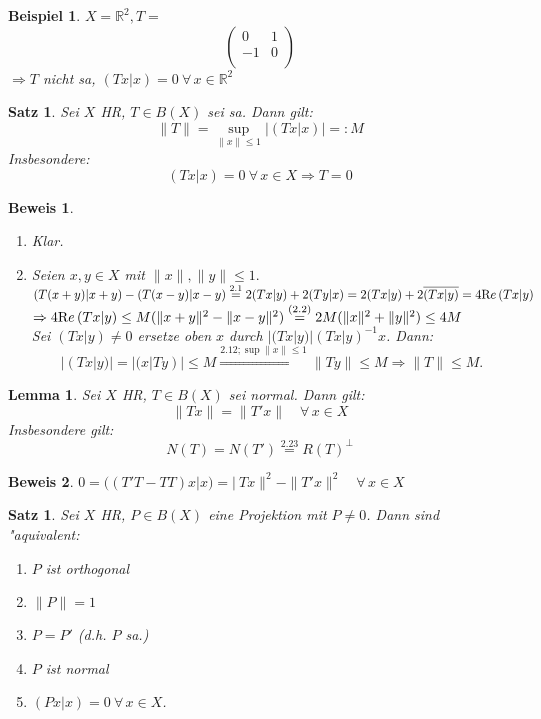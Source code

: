 \documentclass[a4paper,11pt]{book}
\newcommand{\R}{{\mathbb R}}
\newcommand{\re}{\ensuremath{\text Re}\,} %
\newtheorem{Sa}[Def]{Satz}
\newtheorem{Lem}[Def]{Lemma}
\newtheorem*{BspNO}{Beispiel}
\theoremstyle{nonumberplain}
\newtheorem{Bew}{Beweis}
\begin{document}
\begin{BspNO}
$X = \R^2, T =$
\[
\left(\begin{array}{rc}
0 & 1 \\
-1 & 0 \\
\end{array} \right)
\]
$\Rightarrow T$ nicht sa, $(Tx|x) = 0 \ \forall\, x \in \R^2$
\end{BspNO}


\begin{Sa}
Sei $X$ HR, $T \in B(X)$ sei sa. Dann gilt:
\[
\| T \| = \sup_{\|x\| \leq 1} \left| (Tx|x) \right| =: M
\]
Insbesondere:
\[
(Tx|x) = 0 \ \forall\, x \in X \Rightarrow T = 0
\]
\end{Sa}

\begin{Bew}
\begin{enumerate}
\item["` $\geq$ "'] Klar.

\item["` $\leq$ "'] Seien $x,y \in X$ mit $\|x\|,\|y\| \leq 1.$\\
$(T(x+y)|x+y) - (T(x-y)|x-y) \stackrel{2.1}{=} 2(Tx|y) + 2(Ty|x) = 2(Tx|y) + 2 \overline{(Tx|y)} = 4 \re (Tx|y)$\\
$\Rightarrow 4 \re (Tx|y) \leq M( \|x+y\|^2 - \|x-y\|^2) \stackrel{(2.2)}{=} 2M(\|x\|^2 + \|y\|^2) \leq 4M$\\
Sei $(Tx|y) \not =0$ ersetze oben $x$ durch $|(Tx|y)|(Tx|y)^{-1}x$. Dann:
\[
|(Tx|y)| = |(x|Ty)| \leq M \stackrel{2.12; \sup \|x\| \leq 1}{\Longrightarrow} \|Ty\| \leq M \Longrightarrow \|T\| \leq M.
\]
\end{enumerate}
\end{Bew}


\begin{Lem}
Sei $X$ HR, $T \in B(X)$ sei normal. Dann gilt:
\[
\| Tx \| = \| T'x \| \quad \forall\, x \in X
\]
Insbesondere gilt:
\[
N(T) = N(T') \stackrel{2.23}{=} R(T)^{\bot}
\]
\end{Lem}

\begin{Bew}
$0 = ((T'T-TT)x|x) = |\ Tx \|^2 - \| T'x \|^2 \quad \forall\, x \in X$
\end{Bew}


\begin{Sa}
Sei $X$ HR, $P \in B(X)$ eine Projektion mit $P \not= 0$. Dann sind "aquivalent:
\begin{enumerate}
\item[a)] $P$ ist orthogonal

\item[b)] $\|P\| = 1$

\item[c)] $P = P'$ (d.h. $P$ sa.)

\item[d)] $P$ ist normal

\item[e)] $(Px|x) = 0 \ \forall\, x \in X$.
\end{enumerate}
\end{Sa}
\end{document}
